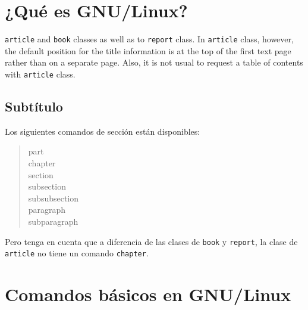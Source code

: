 \chapter{¿Qué es GNU/Linux?}

	\lipsum[1] \texttt{article} and \texttt{book} classes as well as to \texttt{report} class. In \texttt{article} class, however, the default position for the title information is at the top of the first text page rather than on a separate page. Also, it is not usual to request a table of contents with \texttt{article} class.

\section{Subtítulo}

Los siguientes comandos de sección están disponibles:
\begin{quote}
 part \\
 chapter \\%
 section \\
 subsection \\
 subsubsection \\
 paragraph \\
 subparagraph
\end{quote}%

Pero tenga en cuenta que  a diferencia de las clases de \texttt{book} y \texttt{report}, la clase de \texttt{article} no tiene un comando \texttt{chapter}.

\chapter{Comandos básicos en GNU/Linux}
	\lipsum[1]